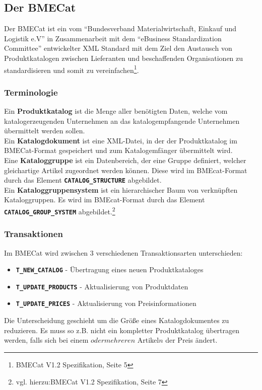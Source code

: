 	\subsection{Der BMECat} %
	
	Der BMECat ist ein vom \enquote{Bundesverband Materialwirtschaft, Einkauf und Logistik e.V} in Zusammenarbeit mit dem \enquote{eBusiness Standardization Committee} entwickelter XML
	Standard mit dem Ziel den Austausch von Produktkatalogen zwischen Lieferanten und beschaffenden Organisationen zu standardisieren und somit zu vereinfachen\footnote{BMECat V1.2 Spezifikation, Seite 5}. 
	
	\subsubsection{Terminologie}
	Ein \textbf{Produktkatalog} ist die Menge aller benötigten Daten, welche vom katalogerzeugenden Unternehmen an das katalogempfangende Unternehmen übermittelt werden sollen.\\
	Ein \textbf{Katalogdokument} ist eine XML-Datei, in der der Produktkatalog im BMECat-Format gespeichert und zum Katalogemfänger übermittelt wird.\\
	Eine \textbf{Kataloggruppe} ist ein Datenbereich, der eine Gruppe definiert, welcher gleichartige Artikel zugeordnet werden können. Diese wird im BMEcat-Format durch das Element \texttt{\textbf{CATALOG\_STRUCTURE}} abgebildet.\\
	Ein \textbf{Kataloggruppensystem} ist ein hierarchischer Baum von verknüpften Kataloggruppen. Es wird
	im BMEcat-Format durch das Element \texttt{\textbf{CATALOG\_GROUP\_SYSTEM}} abgebildet.\footnote{vgl. hierzu:BMECat V1.2 Spezifikation, Seite 7}
	
	\subsubsection{Transaktionen}
	Im BMECat wird zwischen 3 verschiedenen Transaktionsarten unterschieden:
	\begin{itemize}[noitemsep]
	\item \texttt{\textbf{T\_NEW\_CATALOG}} - Übertragung eines neuen Produktkataloges
	\item \texttt{\textbf{T\_UPDATE\_PRODUCTS}} - Aktualisierung von Produktdaten
	\item \texttt{\textbf{T\_UPDATE\_PRICES}} - Aktualisierung von Preisinformationen
	\end{itemize} 
	Die Unterscheidung geschieht um die Größe eines Katalogdokumentes zu reduzieren. Es muss so z.B. nicht ein kompletter Produktkatalog übertragen werden, falls sich bei einem \(oder mehreren\) Artikel\(n\) der Preis ändert. %
	
